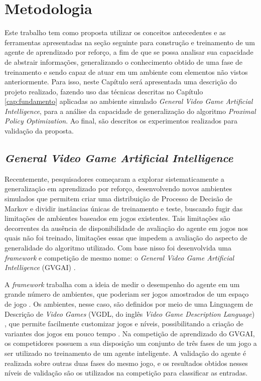 \chapter{Metodologia}
\label{cap:metodologia}

Este trabalho tem como proposta utilizar os conceitos antecedentes e as ferramentas apresentadas na seção seguinte para construção e treinamento de um agente de aprendizado por reforço, a fim de que se possa analisar sua capacidade de abstrair informações, generalizando o conhecimento obtido de uma fase de treinamento e sendo capaz de atuar em um ambiente com elementos não vistos anteriormente. Para isso, neste Capítulo será apresentada uma descrição do projeto realizado, fazendo uso das técnicas descritas no Capítulo \ref{cap:fundamento} aplicadas ao ambiente simulado \textit{General Video Game Artificial Intelligence}, para a análise da capacidade de generalização do algoritmo \textit{Proximal Policy Optimization}. Ao final, são descritos os experimentos realizados para validação da proposta.

\section{\textit{General Video Game Artificial Intelligence}}

Recentemente, pesquisadores começaram a explorar sistematicamente a generalização em aprendizado por reforço, desenvolvendo novos ambientes simulados que permitem criar uma distribuição de Processo de Decisão de Markov e dividir instâncias únicas de treinamento e teste, buscando fugir das limitações de ambientes baseados em jogos existentes. Tais limitações são decorrentes da ausência de disponibilidade de avaliação do agente em jogos nos quais não foi treinado, limitações essas que impedem a avaliação do aspecto de generalidade do algoritmo utilizado. Com base nisso foi desenvolvida uma \textit{framework} e competição de mesmo nome: o \textit{General Video Game Artificial Intelligence} (GVGAI) \cite{torrado18, perez18}. 

A \textit{framework} trabalha com a ideia de medir o desempenho do agente em um grande número de ambientes, que poderiam ser jogos amostrados de um espaço de jogo \cite{schaul11}. Os ambientes, nesse caso, são definidos por meio de uma Linguagem de Descrição de \textit{Video Games} (VGDL, do inglês \textit{Video Game Description Language}) \cite{Schaul13}, que permite facilmente customizar jogos e níveis, possibilitando a criação de variantes dos jogos em pouco tempo \cite{gvgaibook2019}. Na competição de aprendizado do GVGAI, os competidores possuem a sua disposição um conjunto de três fases de um jogo a ser utilizado no treinamento de um agente inteligente. A validação do agente é realizada sobre outras duas fases do mesmo jogo, e os resultados obtidos nesses níveis de validação são os utilizados na competição para classificar as entradas.

